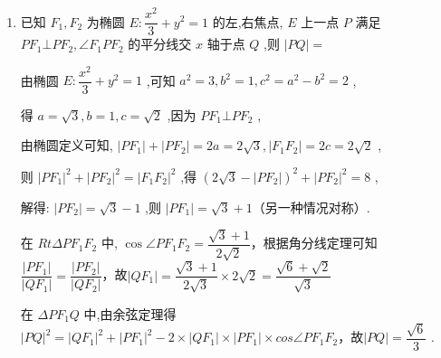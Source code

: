 \begin{enumerate}
\begin{jieda}
        联立解得: $\left| {P{F}_{1}}\right| \left| {P{F}_{2}}\right|  = \dfrac{5}{2}$ ,则 ${\left| P{F}_{1}\right| }^{2} + {\left| P{F}_{2}\right| }^{2} = 7$ ,
        
        又因为 $\vv{PO} = \dfrac{1}{2}\left( {\vv{P{F}_{1}} + \vv{P{F}_{2}}}\right)$ ,则 $\left| {PO}\right|  = \left| \vv{PO}\right|  = \dfrac{1}{2}\left| {\vv{P{F}_{1}} + \vv{P{F}_{2}}}\right|$ ,
        
        使用 $\left| \vv{PO}\right|  = \dfrac{1}{2}\left| {\vv{P{F}_{1}} + \vv{P{F}_{2}}}\right|  = \dfrac{1}{2}\sqrt{{\left| \vv{P{F}_{1}}\right| }^{2} + {\left| \vv{P{F}_{2}}\right| }^{2} + 2\vv{P{F}_{1}} \cdot  \vv{P{F}_{2}}} = \dfrac{1}{2}\sqrt{7 + 2 \times  \dfrac{5}{2} \times  \dfrac{3}{5}} = \dfrac{\sqrt{10}}{2}$ .
    \end{jieda}


    \item 已知 ${F}_{1},{F}_{2}$ 为椭圆 $E : \dfrac{{x}^{2}}{3} + {y}^{2} = 1$ 的左,右焦点, $E$ 上一点 $P$ 满足 $P{F}_{1}\bot P{F}_{2},\angle {F}_{1}P{F}_{2}$ 的平分线交 $x$ 轴于点 $Q$ ,则 $\left| {PQ}\right|  =$
    \begin{jieda}
        由椭圆 $E : \dfrac{{x}^{2}}{3} + {y}^{2} = 1$ ,可知 ${a}^{2} = 3,{b}^{2} = 1,{c}^{2} = {a}^{2} - {b}^{2} = 2$ ,

        得 $a = \sqrt{3},b = 1,c = \sqrt{2}$ ,因为 $P{F}_{1} \bot  P{F}_{2}$ ,
        
        由椭圆定义可知, $\left| {P{F}_{1}}\right|  + \left| {P{F}_{2}}\right|  = {2a} = 2\sqrt{3},\left| {{F}_{1}{F}_{2}}\right|  = {2c} = 2\sqrt{2}$ ,
        
        则 ${\left| P{F}_{1}\right| }^{2} + {\left| P{F}_{2}\right| }^{2} = {\left| {F}_{1}{F}_{2}\right| }^{2}$ ,得 ${\left( 2\sqrt{3} - \left| P{F}_{2}\right| \right) }^{2} + {\left| P{F}_{2}\right| }^{2} = 8$ ,
        
        解得: $\left| {P{F}_{2}}\right|  = \sqrt{3} - 1$ ,则 $\left| {P{F}_{1}}\right|  = \sqrt{3} + 1$（另一种情况对称）.
        
        在 ${Rt\Delta P}{F}_{1}F_2$ 中, $\cos \angle P{F}_{1}F_2 = \dfrac{\sqrt{3} + 1}{2\sqrt{2}}$，根据角分线定理可知$\dfrac{|PF_1|}{|QF_1|} = \dfrac{|PF_2|}{|QF_2|}$，故$|QF_1| = \dfrac{\sqrt{3}+1}{2\sqrt{3}} \times 2\sqrt{2} = \dfrac{\sqrt{6}+\sqrt{2}}{\sqrt{3}}$
        
        在 ${\Delta P}{F}_{1}Q$ 中,由余弦定理得$|PQ|^2 = |QF_1|^2 + |PF_1|^2 - 2\times|QF_1| \times |PF_1| \times cos \angle P{F}_{1}F_2$，故$\left| {PQ}\right|  = \dfrac{\sqrt{6}}{3}$ .
    \end{jieda}
    

\end{enumerate}
